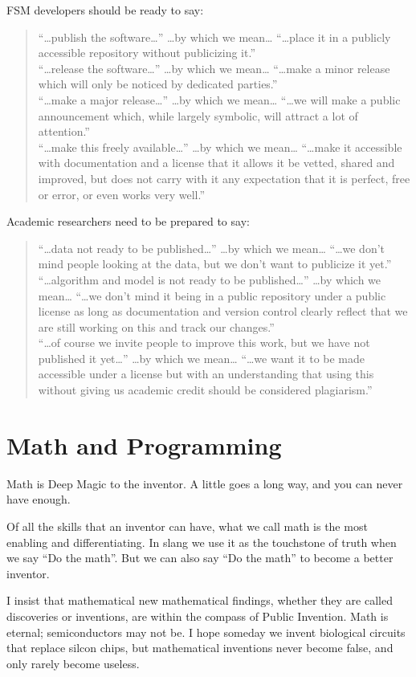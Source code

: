\documentclass[
	fontsize=10pt, %
	twoside=false, %
	secnumdepth=1, %
]{kaobook}
\begin{document}
FSM developers should be ready to say:
\blockquote{
“…publish the software…” …by which we mean… “…place it in a publicly accessible repository without publicizing it.” \\
“…release the software…” …by which we mean… “…make a minor release which will only be noticed by dedicated parties.” \\
“…make a major release…” …by which we mean… “…we will make a public announcement which, while largely symbolic, will attract a lot of attention.” \\
“…make this freely available…” …by which we mean… “…make it accessible with documentation and a license that it allows it be vetted, shared and improved, but does not carry with it any expectation that it is perfect, free or error, or even works very well.”
}
Academic researchers need to be prepared to say:
\blockquote{
“…data not ready to be published…” …by which we mean… “…we don’t mind people looking at the data, but we don’t want to publicize it yet.” \\
“…algorithm and model is not ready to be published…” …by which we mean… “…we don’t mind it being in a public repository under a public license as long as documentation and version control clearly reflect that we are still working on this and track our changes.” \\
  “…of course we invite people to improve this work, but we have not published it yet…” …by which we mean… “…we want it to be made accessible under a license but with an understanding that using this without giving us academic credit should be considered plagiarism.” \\
  }

\chapter{Math and Programming}

Math is Deep Magic to the inventor. A little goes a long way,
and you can never have enough.

Of all the skills that an inventor can have, what we call math
is the most enabling and differentiating. In slang we use
it as the touchstone of truth when we say ``Do the math''.
But we can also say ``Do the math'' to become a better inventor.

I insist that mathematical new mathematical findings, whether they are called
discoveries or inventions, are within the compass of Public Invention.
Math is eternal; semiconductors may not be. I hope someday we invent
biological circuits that replace silcon chips, but mathematical inventions
never become false, and only rarely become useless.
\end{document}
